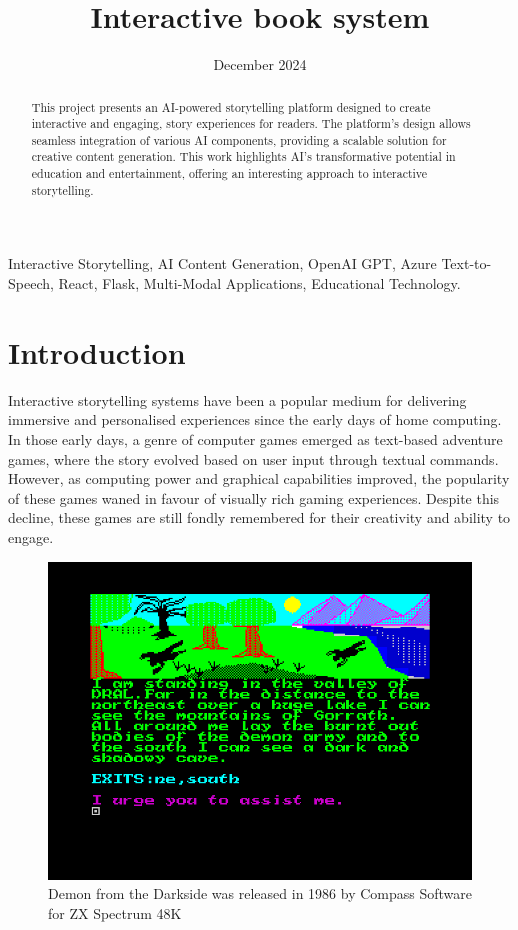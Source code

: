 \documentclass[conference]{IEEEtran}
\begin{document}
	
	\title{Interactive book system}
	
	\author{
		\date{December 2024}
	}
	
	\maketitle
	
	\begin{abstract}
		This project presents an AI-powered storytelling platform designed to create interactive and engaging, story experiences for readers. The platform's design allows seamless integration of various AI components, providing a scalable solution for creative content generation. This work highlights AI's transformative potential in education and entertainment, offering an interesting approach to interactive storytelling.
	\end{abstract}
	
	\begin{IEEEkeywords}
		Interactive Storytelling, AI Content Generation, OpenAI GPT, Azure Text-to-Speech, React, Flask, Multi-Modal Applications, Educational Technology.
	\end{IEEEkeywords}
	
	\section{Introduction}
	
	Interactive storytelling systems have been a popular medium for delivering immersive and personalised experiences since the early days of home computing. In those early days, a genre of computer games emerged as text-based adventure games, where the story evolved based on user input through textual commands\cite{brooker2021filling}\cite{woodcock2012zx}. However, as computing power and graphical capabilities improved, the popularity of these games waned in favour of visually rich gaming experiences. Despite this decline, these games are still fondly remembered for their creativity and ability to engage.
		
	\begin{figure}[!h]
		\centering
		\includegraphics[width=0.7\linewidth]{img/img-ari3333-project-report-adventure-games}
		\caption{Demon from the Darkside was released in 1986 by Compass Software for ZX Spectrum 48K\cite{demonfromdarkside2020}}
		\label{fig:img-ari3333-project-report-adventure-games}
	\end{figure}
		
\end{document}
